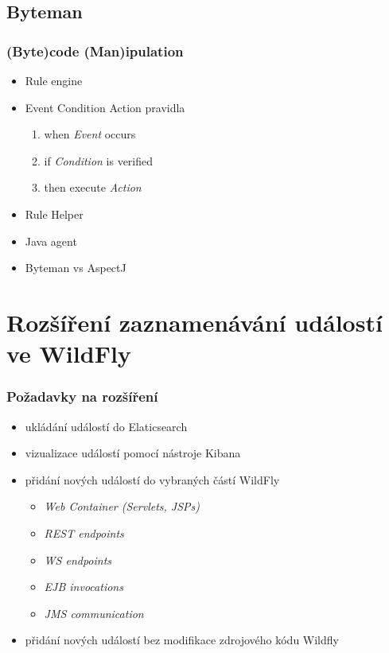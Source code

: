 \documentclass{beamer}
\begin{document}
\subsection{Byteman}
\begin{frame}
	\frametitle{(\textbf{Byte})code (\textbf{Man})ipulation}
\begin{itemize}
	\item Rule engine
	\item Event Condition Action pravidla
	\begin{enumerate}
		\item when \textit{Event} occurs
		\item if \textit{Condition} is verified
		\item then execute \textit{Action}
	\end{enumerate}
	\item Rule Helper
	\item Java agent
	\item Byteman vs AspectJ
\end{itemize}
\end{frame}

\section{Rozšíření zaznamenávání událostí ve WildFly}

\begin{frame}
	\frametitle{Požadavky na rozšíření}
	
	\begin{itemize}
		\item ukládání událostí do Elaticsearch
		\item vizualizace událostí pomocí nástroje Kibana
		\item přidání nových událostí do vybraných částí WildFly
		\begin{itemize}
			\item \textit{Web Container (Servlets, JSPs)}
			\item \textit{REST endpoints}
			\item \textit{WS endpoints}
			\item \textit{EJB invocations}
			\item \textit{JMS communication}
		\end{itemize}
		\item přidání nových událostí bez modifikace zdrojového kódu Wildfly
	\end{itemize}
\end{frame}
\end{document}
